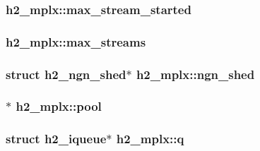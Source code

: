 \subsubsection[{\texorpdfstring{max\+\_\+stream\+\_\+started}{max_stream_started}}]{ h2\+\_\+mplx\+::max\+\_\+stream\+\_\+started}\hypertarget{structh2__mplx_a8ca4248d31d38a65be9c4d78b53d1c5c}{}\label{structh2__mplx_a8ca4248d31d38a65be9c4d78b53d1c5c}
\subsubsection[{\texorpdfstring{max\+\_\+streams}{max_streams}}]{ h2\+\_\+mplx\+::max\+\_\+streams}\hypertarget{structh2__mplx_a3e9f0fd33b0cb44fe3b4ca711c6ca2a3}{}\label{structh2__mplx_a3e9f0fd33b0cb44fe3b4ca711c6ca2a3}
\subsubsection[{\texorpdfstring{ngn\+\_\+shed}{ngn_shed}}]{\setlength{\rightskip}{0pt plus 5cm}struct {\bf h2\+\_\+ngn\+\_\+shed}$\ast$ h2\+\_\+mplx\+::ngn\+\_\+shed}\hypertarget{structh2__mplx_ab9d2944dc8737d9f6f00c752fc0cef09}{}\label{structh2__mplx_ab9d2944dc8737d9f6f00c752fc0cef09}
\subsubsection[{\texorpdfstring{pool}{pool}}]{$\ast$ h2\+\_\+mplx\+::pool}\hypertarget{structh2__mplx_a81f496a92c5d1825e554c1e24099d276}{}\label{structh2__mplx_a81f496a92c5d1825e554c1e24099d276}
\subsubsection[{\texorpdfstring{q}{q}}]{\setlength{\rightskip}{0pt plus 5cm}struct {\bf h2\+\_\+iqueue}$\ast$ h2\+\_\+mplx\+::q}\hypertarget{structh2__mplx_ad17f6957099ada646931069bda0239db}{}\label{structh2__mplx_ad17f6957099ada646931069bda0239db}
